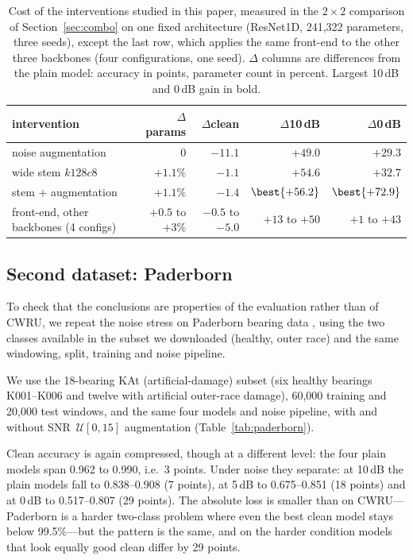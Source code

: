 \begin{table}[t]
\centering
\caption{Cost of the interventions studied in this paper, measured in the $2\times2$ comparison of Section~\ref{sec:combo} on one fixed architecture (ResNet1D, 241{,}322 parameters, three seeds), except the last row, which applies the same front-end to the other three backbones (four configurations, one seed). $\Delta$ columns are differences from the plain model: accuracy in points, parameter count in percent. Largest 10\,dB and 0\,dB gain in bold.}
\label{tab:cost}
\begin{tabular}{lrrrr}
\toprule
intervention & $\Delta$params & $\Delta$clean & $\Delta$10\,dB & $\Delta$0\,dB\\
\midrule
noise augmentation          & $0$      & $-11.1$ & $+49.0$ & $+29.3$\\
wide stem $k128c8$          & $+1.1\%$ & $-1.1$  & $+54.6$ & $+32.7$\\
stem + augmentation         & $+1.1\%$ & $-1.4$  & $\best{+56.2}$ & $\best{+72.9}$\\
front-end, other backbones (4 configs) & $+0.5$ to $+3\%$ & $-0.5$ to $-5.0$ & $+13$ to $+50$ & $+1$ to $+43$\\
\bottomrule
\end{tabular}
\end{table}

\subsection{Second dataset: Paderborn}
\label{sec:paderborn}

To check that the conclusions are properties of the evaluation rather than of CWRU, we repeat the noise stress on Paderborn bearing data \citep{lessmeier2016paderborn}, using the two classes available in the subset we downloaded (healthy, outer race) and the same windowing, split, training and noise pipeline.

We use the 18-bearing KAt (artificial-damage) subset (six healthy bearings K001--K006 and twelve with artificial outer-race damage), 60,000 training and 20,000 test windows, and the same four models and noise pipeline, with and without SNR~$\mathcal{U}[0,15]$ augmentation (Table~\ref{tab:paderborn}).

Clean accuracy is again compressed, though at a different level: the four plain models span 0.962 to 0.990, i.e.\ 3 points. Under noise they separate: at 10\,dB the plain models fall to 0.838--0.908 (7 points), at 5\,dB to 0.675--0.851 (18 points) and at 0\,dB to 0.517--0.807 (29 points). The absolute loss is smaller than on CWRU---Paderborn is a harder two-class problem where even the best clean model stays below 99.5\%---but the pattern is the same, and on the harder condition models that look equally good clean differ by 29 points.

